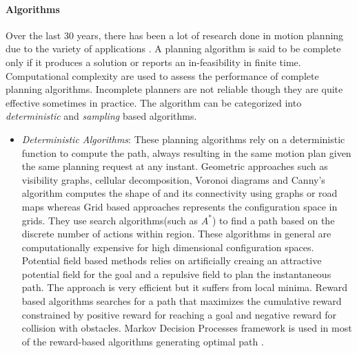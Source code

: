 \paragraph{Algorithms}Over the last 30 years, there has been a lot of research done in motion planning due to the variety of applications . A planning  algorithm is said to be complete only if it produces a solution or reports an in-feasibility in finite time. Computational complexity  are used to assess the performance of complete planning algorithms. Incomplete planners are not reliable though they are quite effective sometimes in practice. The algorithm can be categorized into \textit{deterministic} and \textit{sampling} based algorithms.
\begin{itemize}
\item \textit{Deterministic Algorithms}: These planning algorithms rely on a deterministic function to compute the path, always resulting in the same motion plan given the same planning request at any instant. Geometric approaches such as visibility graphs, cellular decomposition, Voronoi diagrams and Canny's algorithm computes the shape of \CSfree{} and its connectivity using graphs or road maps \cite{toth2004handbook,canny1988complexity} whereas Grid based approaches represents the configuration space in grids. They use search algorithms(such as $A^*$) to find a path based on the discrete number of actions within \CSfree{} region. These algorithms in general are computationally expensive for high dimensional configuration spaces. Potential field based methods relies on artificially creaing an attractive potential field for the goal and a repulsive field to plan the instantaneous path. The approach is very efficient but it suffers from local minima. Reward based algorithms searches for a path that maximizes the cumulative reward constrained by positive reward for reaching a goal and negative reward for collision with obstacles. Markov Decision Processes framework is used in most of the reward-based algorithms generating optimal path \cite{spaan2004point}. 

\end{itemize}
